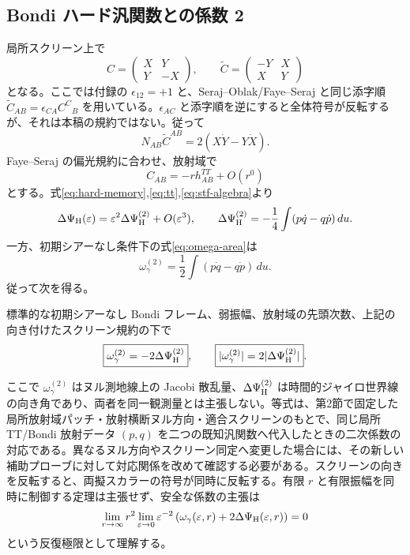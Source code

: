 \subsection{Bondi ハード汎関数との係数 2}
局所スクリーン上で
\[
C=\begin{pmatrix}X&Y\\Y&-X\end{pmatrix},\qquad
\widetilde C=\begin{pmatrix}-Y&X\\X&Y\end{pmatrix}
\]
となる。ここでは付録の $\epsilon_{12}=+1$ と、Seraj--Oblak/Faye--Seraj と同じ添字順
$\widetilde C_{AB}=\epsilon_{CA}C^C{}_B$ を用いている。$\epsilon_{AC}$ と添字順を逆にすると全体符号が反転するが、それは本稿の規約ではない。従って
\begin{equation}
N_{AB}\widetilde C^{AB}=2(X\dot Y-Y\dot X).
\label{eq:stf-algebra}
\end{equation}
Faye--Seraj の偏光規約に合わせ、放射域で
\begin{equation}
C_{AB}=-r h^{TT}_{AB}+O(r^0)
\label{eq:shear-strain}
\end{equation}
とする。式\eqref{eq:hard-memory},\eqref{eq:tt},\eqref{eq:stf-algebra}より
\begin{equation}
\Delta\Psi_{\rm H}(\varepsilon)
=\varepsilon^2\Delta\Psi_{\rm H}^{(2)}+O(\varepsilon^3),
\qquad
\Delta\Psi_{\rm H}^{(2)}
=-\frac14\int(p\dot q-q\dot p)\,du.
\label{eq:gyro-area}
\end{equation}
一方、初期シアーなし条件下の式\eqref{eq:omega-area}は
\begin{equation}
\omega_\gamma^{(2)}=\frac12\int(p\dot q-q\dot p)\,du.
\label{eq:jacobi-area-eps}
\end{equation}
従って次を得る。

\begin{theorem}[同一放射データ上の二次汎関数の係数対応]
\label{thm:bridge}
標準的な初期シアーなし Bondi フレーム、弱振幅、放射域の先頭次数、上記の向き付けたスクリーン規約の下で
\begin{equation}
\boxed{\omega_\gamma^{(2)}=-2\Delta\Psi_{\rm H}^{(2)}},\qquad
\boxed{|\omega_\gamma^{(2)}|=2|\Delta\Psi_{\rm H}^{(2)}|}.
\label{eq:bridge}
\end{equation}
\end{theorem}

ここで $\omega_\gamma^{(2)}$ はヌル測地線上の Jacobi 散乱量、$\Delta\Psi_{\rm H}^{(2)}$ は時間的ジャイロ世界線の向き角であり、両者を同一観測量とは主張しない。等式は、第2節で固定した局所放射域パッチ・放射横断ヌル方向・適合スクリーンのもとで、同じ局所 TT/Bondi 放射データ $(p,q)$ を二つの既知汎関数へ代入したときの二次係数の対応である。異なるヌル方向やスクリーン同定へ変更した場合には、その新しい補助プローブに対して対応関係を改めて確認する必要がある。スクリーンの向きを反転すると、両擬スカラーの符号が同時に反転する。有限 $r$ と有限振幅を同時に制御する定理は主張せず、安全な係数の主張は
\begin{equation}
\lim_{r\to\infty}r^2\lim_{\varepsilon\to0}\varepsilon^{-2}
\left(\omega_\gamma(\varepsilon,r)+2\Delta\Psi_{\rm H}(\varepsilon,r)\right)=0
\label{eq:iterated-limit}
\end{equation}
という反復極限として理解する。

